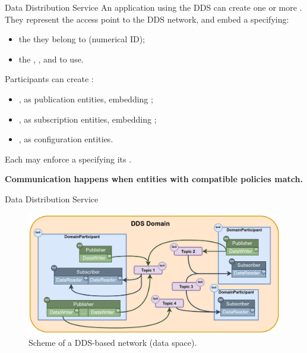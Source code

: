 \begin{frame}{Data Distribution Service}
An application using the DDS can create one or more .\\
They represent the access point to the DDS network, and embed a  specifying:
\begin{itemize}
  \item the  they belong to (numerical ID);
  \item the , , and  to use.
\end{itemize}
\bigskip
Participants can create :
\begin{itemize}
  \item {}, as publication entities, embedding ;
  \item {}, as subscription entities, embedding ;
  \item {}, as configuration entities.
\end{itemize}
Each may enforce a  specifying its .
\begin{block}{}
  \centering
  \textbf{Communication happens when entities with compatible policies match.}
\end{block}
\end{frame}
\begin{frame}{Data Distribution Service}
	\begin{figure}
		\centering
		\includegraphics[width=.85\textwidth]{dds_domain}
		\caption{Scheme of a DDS-based network (data space).}
		\label{fig:ddsdomain}
	\end{figure}
\end{frame}
